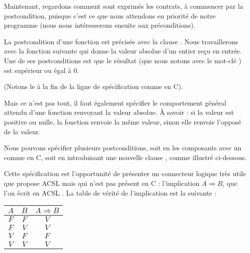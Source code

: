Maintenant, regardons comment sont exprimés les contrats, à commencer par la
postcondition, puisque c'est ce que nous attendons en priorité de notre 
programme (nous nous intéresserons ensuite aux préconditions).





La postcondition d'une fonction est précisée avec la clause . 
Nous travaillerons avec la fonction suivante qui donne la valeur absolue
d'un entier reçu en entrée. 
Une de ses postconditions est que le résultat (que nous notons avec le 
mot-clé ) est supérieur ou égal à 0.






(Notons le \CodeInline{;} à la fin de la ligne de spécification comme en C).



Mais ce n'est pas tout, il faut également spécifier le comportement général 
attendu d'une fonction renvoyant la valeur absolue. À savoir : si la valeur
est positive ou nulle, la fonction renvoie la même valeur, sinon elle renvoie 
l'opposé de la valeur.



Nous pouvons spécifier plusieurs postconditions, soit en les composants avec 
un \CodeInline{\&\&} comme en C, soit en introduisant une nouvelle clause , 
comme illustré ci-dessous.






Cette spécification est l'opportunité de présenter un connecteur logique 
très utile que propose ACSL mais qui n'est pas présent en C : 
l'implication $A \Rightarrow B$, que l'on écrit en ACSL .
La table de vérité de l'implication est la suivante :



\begin{longtabu}{|c|c|c|} \hline
$A$ & $B$ & $A \Rightarrow B$ \\ \hline
$F$ & $F$ & $V$ \\ \hline
$F$ & $V$ & $V$ \\ \hline
$V$ & $F$ & $F$ \\ \hline
$V$ & $V$ & $V$ \\ \hline
\end{longtabu}



